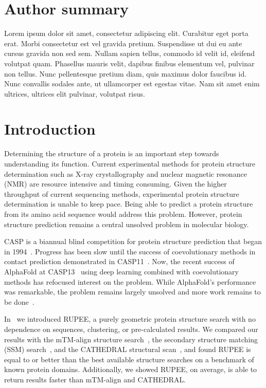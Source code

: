\documentclass[10pt,letterpaper]{article}
\begin{document}
\section*{Author summary}
Lorem ipsum dolor sit amet, consectetur adipiscing elit. Curabitur eget porta erat. Morbi consectetur est vel gravida pretium. Suspendisse ut dui eu ante cursus gravida non sed sem. Nullam sapien tellus, commodo id velit id, eleifend volutpat quam. Phasellus mauris velit, dapibus finibus elementum vel, pulvinar non tellus. Nunc pellentesque pretium diam, quis maximus dolor faucibus id. Nunc convallis sodales ante, ut ullamcorper est egestas vitae. Nam sit amet enim ultrices, ultrices elit pulvinar, volutpat risus.

\linenumbers

\section*{Introduction}

Determining the structure of a protein is an important step towards understanding its function.
Current experimental methods for protein structure determination such as X-ray crystallography and nuclear magnetic resonance (NMR) are resource intensive and timing consuming.
Given the higher throughput of current sequencing methods, experimental protein structure determination is unable to keep pace.
Being able to predict a protein structure from its amino acid sequence would address this problem. 
However, protein structure prediction remains a central unsolved problem in molecular biology. 

CASP is a biannual blind competition for protein structure prediction that began in 1994~\cite{Moult1995}.
Progress has been slow until the success of coevolutionary methods in contact prediction demonstrated in CASP11~\cite{Moult2016}.
Now, the recent success of AlphaFold at CASP13~\cite{alq2019} using deep learning combined with coevolutionary methods has refocused interest on the problem. 
While AlphaFold's performance was remarkable, the problem remains largely unsolved and more work remains to be done~\cite{alq2019}. 

In~\cite{Ayoub2019} we introduced RUPEE, a purely geometric protein structure search with no dependence on sequences, clustering, or pre-calculated results. 
We compared our results with the mTM-align structure search~\cite{Dong2018}, the secondary structure matching (SSM) search~\cite{Krissinel2004}, and the CATHEDRAL structural scan~\cite{Redfern2007}, and found RUPEE is equal to or better than the best available structure searches on a benchmark of known protein domains. 
Additionally, we showed RUPEE, on average, is able to return results faster than mTM-align and CATHEDRAL. 
\end{document}

